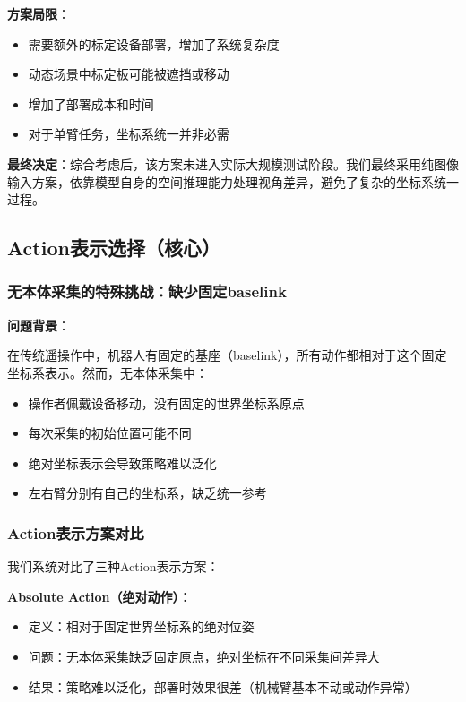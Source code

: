\textbf{方案局限}：
\begin{itemize}[leftmargin=2em]
    \item 需要额外的标定设备部署，增加了系统复杂度
    \item 动态场景中标定板可能被遮挡或移动
    \item 增加了部署成本和时间
    \item 对于单臂任务，坐标系统一并非必需
\end{itemize}

\textbf{最终决定}：综合考虑后，该方案未进入实际大规模测试阶段。我们最终采用纯图像输入方案，依靠模型自身的空间推理能力处理视角差异，避免了复杂的坐标系统一过程。

\subsection{Action表示选择（核心）}

\subsubsection{无本体采集的特殊挑战：缺少固定baselink}

\textbf{问题背景}：

在传统遥操作中，机器人有固定的基座（baselink），所有动作都相对于这个固定坐标系表示。然而，无本体采集中：
\begin{itemize}[leftmargin=2em]
    \item 操作者佩戴设备移动，没有固定的世界坐标系原点
    \item 每次采集的初始位置可能不同
    \item 绝对坐标表示会导致策略难以泛化
    \item 左右臂分别有自己的坐标系，缺乏统一参考
\end{itemize}

\subsubsection{Action表示方案对比}

我们系统对比了三种Action表示方案：

\textbf{Absolute Action（绝对动作）}：
\begin{itemize}[leftmargin=2em]
    \item 定义：相对于固定世界坐标系的绝对位姿
    \item 问题：无本体采集缺乏固定原点，绝对坐标在不同采集间差异大
    \item 结果：策略难以泛化，部署时效果很差（机械臂基本不动或动作异常）
\end{itemize}

